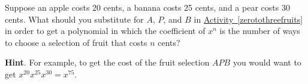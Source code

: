 \documentclass{book}
\begin{document}
\setcounter{cpjt}{242}
\addtocounter{cpjt}{-1}
\begin{activity}\label{activity-235}
\hypertarget{p-1272}{}%
Suppose an apple costs 20 cents, a banana costs 25 cents, and a pear costs 30 cents. What should you substitute for \(A\), \(P\), and \(B\) in \hyperref[zerotothreefruits]{Activity~\ref{zerotothreefruits}} in order to get a polynomial in which the coefficient of \(x^n\) is the number of ways to choose a selection of fruit that costs \(n\) cents?%
\par\smallskip%
\noindent\textbf{Hint}.\hypertarget{hint-153}{}\quad%
\hypertarget{p-1273}{}%
For example, to get the cost of the fruit selection \(AP B\) you would want to get \(x^{20} x^{25} x^{30} = x^{75}\).%
\par\smallskip%
\noindent\end{activity}

\clearpage
\end{document}
